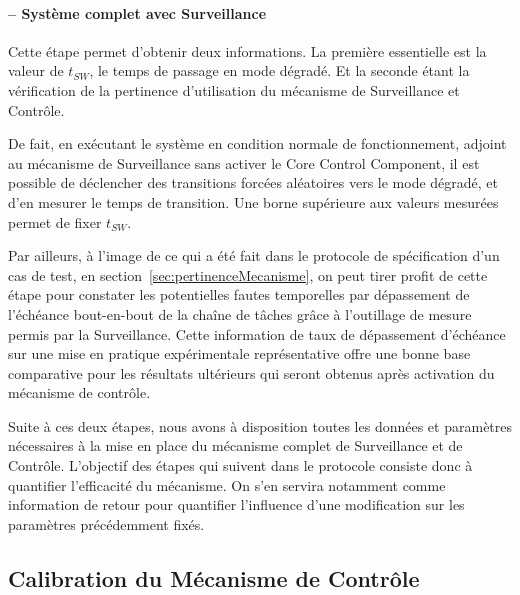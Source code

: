 \documentclass[french, a4paper, 11pt, twoside, pdftex]{StyleThese}
\begin{document}
                    
            \paragraph{ -- Système complet avec Surveillance}
            
            Cette étape permet d'obtenir deux informations. La première essentielle est la valeur de $t_{SW}$, le temps de passage en mode dégradé. Et la seconde étant la vérification de la pertinence d'utilisation du mécanisme de Surveillance et Contrôle. 
            
            De fait, en exécutant le système en condition normale de fonctionnement, adjoint au mécanisme de Surveillance sans activer le Core Control Component, il est possible de déclencher des transitions forcées aléatoires vers le mode dégradé, et d'en mesurer le temps de transition. Une borne supérieure aux valeurs mesurées permet de fixer $t_{SW}$.
            
            Par ailleurs, à l'image de ce qui a été fait dans le protocole de spécification d'un cas de test, en section~\ref{sec:pertinenceMecanisme}, on peut tirer profit de cette étape pour constater les potentielles fautes temporelles par dépassement de l'échéance bout-en-bout de la chaîne de tâches grâce à l'outillage de mesure permis par la Surveillance. Cette information de taux de dépassement d'échéance sur une mise en pratique expérimentale représentative offre une bonne base comparative pour les résultats ultérieurs qui seront obtenus après activation du mécanisme de contrôle.
            
            \smallbreak
            Suite à ces deux étapes, nous avons à disposition toutes les données et paramètres nécessaires à la mise en place du mécanisme complet de Surveillance et de Contrôle.
            L'objectif des étapes qui suivent dans le protocole consiste donc à quantifier l'efficacité du mécanisme. On s'en servira notamment comme information de retour pour quantifier l'influence d'une modification sur les paramètres précédemment fixés.
            
    \subsection{Calibration du Mécanisme de Contrôle}
    
\end{document}
